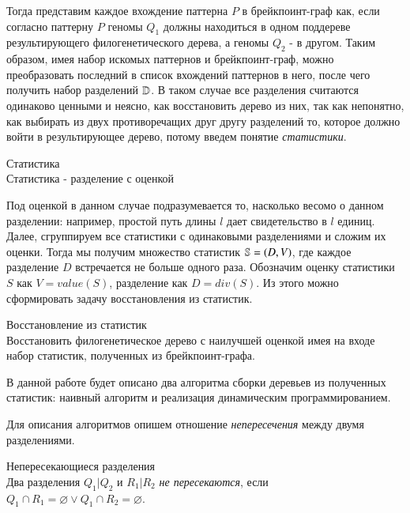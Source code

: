 Тогда представим каждое вхождение паттерна $P$ в брейкпоинт-граф как, если согласно паттерну $P$ геномы $Q_1$ должны находиться в одном поддереве
результирующего филогенетического дерева, а геномы $Q_2$ - в другом.
Таким образом, имея набор искомых паттернов и брейкпоинт-граф, можно преобразовать последний в список вхождений паттернов в него,
после чего получить набор разделений $\mathbb{D}$.
В таком случае все разделения считаются одинаково ценными и неясно, как восстановить дерево из них, так как непонятно,
как выбирать из двух противоречащих друг другу разделений то, которое должно войти в результирующее дерево,
потому введем понятие \textit{статистики}.
\begin{define}{Статистика}\\
  Статистика - разделение с оценкой
\end{define}
Под оценкой в данном случае подразумевается то, насколько весомо  о данном разделении:
например, простой путь длины $l$ дает свидетельство в $l$ единиц.
Далее, сгруппируем все статистики с одинаковыми разделениями и сложим их оценки.
Тогда мы получим множество статистик $\mathbb{S} = {(D, V)}$, где каждое разделение $D$ встречается не больше одного раза.
Обозначим оценку статистики $S$ как $V = value(S)$, разделение как $D = div(S)$.
Из этого можно сформировать задачу восстановления из статистик.
\begin{task}{Восстановление из статистик} \\
  Восстановить филогенетическое дерево с наилучшей оценкой имея на входе набор статистик,
  полученных из брейкпоинт-графа.
\end{task}

В данной работе будет описано два алгоритма сборки деревьев из полученных статистик:
наивный алгоритм и реализация динамическим программированием.

Для описания алгоритмов опишем отношение \textit{непересечения} между двумя разделениями.
\begin{define}{Непересекающиеся разделения} \\
  Два разделения $Q_1|Q_2$ и $R_1|R_2$ \textit{не пересекаются},
  если $Q_1 \cap R_1 = \varnothing \vee Q_1 \cap R_2 = \varnothing $.
\end{define}

